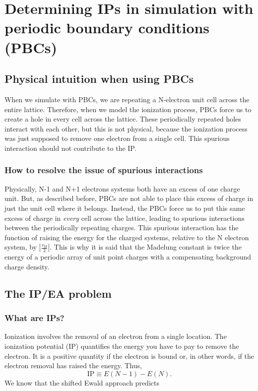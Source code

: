 \section{Determining IPs in simulation with periodic boundary conditions (PBCs)}
\subsection{Physical intuition when using PBCs}
 When we simulate with PBCs, we are repeating a N-electron unit cell across the entire lattice. Therefore, when we model the ionization process, PBCs force us to create a hole in every cell across the lattice. These periodically repeated holes interact with each other, but this is not physical, because the ionization process was just supposed to remove one electron from a single cell. This spurious interaction should not contribute to the IP.
\subsubsection{How to resolve the issue of spurious interactions}
Physically, N-1 and N+1 electrons systems both have an excess of one charge unit. But, as described before, PBCs are not able to place this excess of charge in just the unit cell where it belongs. Instead, the PBCs force us to put this same excess of charge in \emph{every} cell across the lattice, leading to spurious interactions between the periodically repeating charges. This spurious interaction has the function of raising the energy for the charged systems, relative to the N electron system, by $|\frac{v_{\mathrm{M}}}{2}|$. This is why it is said that the Madelung constant is twice the energy of a periodic array of unit point charges with a compensating background charge density.
\subsection{The IP/EA problem}
\subsubsection{What are IPs?}
Ionization involves the removal of an electron from a single location. The ionization potential (IP) quantifies the energy you have to pay to remove the electron. It is a positive quantity if the electron is bound or, in other words, if the electron removal has raised the energy. Thus, 
\begin{equation}
    \text{IP} \equiv E(N-1) - E(N).
\label{eq:IP_def}
\end{equation} We know that the shifted Ewald approach predicts

